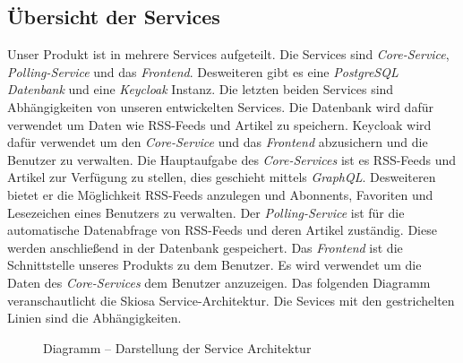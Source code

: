 \subsection{Übersicht der Services}
Unser Produkt ist in mehrere Services aufgeteilt. Die Services sind \textit{Core-Service}, \textit{Polling-Service} und das \textit{Frontend}.
Desweiteren gibt es eine \textit{PostgreSQL Datenbank} und eine \textit{Keycloak} Instanz. Die letzten beiden Services sind Abhängigkeiten von unseren entwickelten Services.
Die Datenbank wird dafür verwendet um Daten wie RSS-Feeds und Artikel zu speichern.
Keycloak wird dafür verwendet um den \textit{Core-Service} und das \textit{Frontend} abzusichern und die Benutzer zu verwalten.
Die Hauptaufgabe des \textit{Core-Services} ist es RSS-Feeds und Artikel zur Verfügung zu stellen, dies geschieht mittels \textit{GraphQL}. Desweiteren bietet er die Möglichkeit
RSS-Feeds anzulegen und Abonnents, Favoriten und Lesezeichen eines Benutzers zu verwalten.
Der \textit{Polling-Service} ist für die automatische Datenabfrage von RSS-Feeds und deren Artikel zuständig. Diese werden anschließend in der Datenbank gespeichert.
Das \textit{Frontend} ist die Schnittstelle unseres Produkts zu dem Benutzer.
Es wird verwendet um die Daten des \textit{Core-Services} dem Benutzer anzuzeigen.
Das folgenden Diagramm veranschautlicht die Skiosa Service-Architektur. Die Sevices mit den gestrichelten Linien sind die Abhängigkeiten.
\begin{figure}[!htbp]
    \centering    
    \usetikzlibrary{positioning}
\caption{Diagramm – Darstellung der Service Architektur}
\end{figure}

